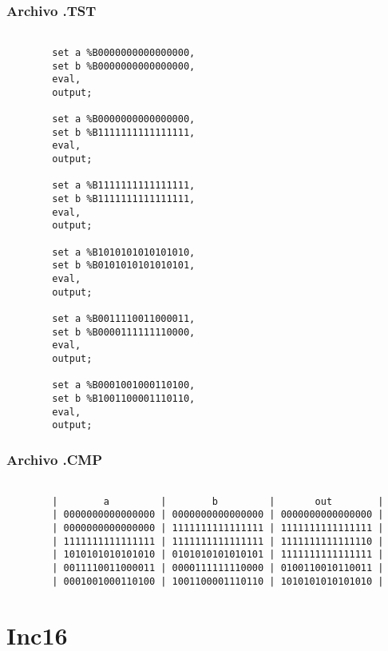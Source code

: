 \documentclass[12pt]{article}
\begin{document}
	\subsubsection{Archivo .TST}
	\begin{lstlisting}

		set a %B0000000000000000,
		set b %B0000000000000000,
		eval,
		output;

		set a %B0000000000000000,
		set b %B1111111111111111,
		eval,
		output;

		set a %B1111111111111111,
		set b %B1111111111111111,
		eval,
		output;

		set a %B1010101010101010,
		set b %B0101010101010101,
		eval,
		output;

		set a %B0011110011000011,
		set b %B0000111111110000,
		eval,
		output;

		set a %B0001001000110100,
		set b %B1001100001110110,
		eval,
		output;

	\end{lstlisting}


	\subsubsection{Archivo .CMP}
	\begin{lstlisting}

		|        a         |        b         |       out        |
		| 0000000000000000 | 0000000000000000 | 0000000000000000 |
		| 0000000000000000 | 1111111111111111 | 1111111111111111 |
		| 1111111111111111 | 1111111111111111 | 1111111111111110 |
		| 1010101010101010 | 0101010101010101 | 1111111111111111 |
		| 0011110011000011 | 0000111111110000 | 0100110010110011 |
		| 0001001000110100 | 1001100001110110 | 1010101010101010 |
	\end{lstlisting}
	\newpage
	\section{Inc16}
\end{document}
